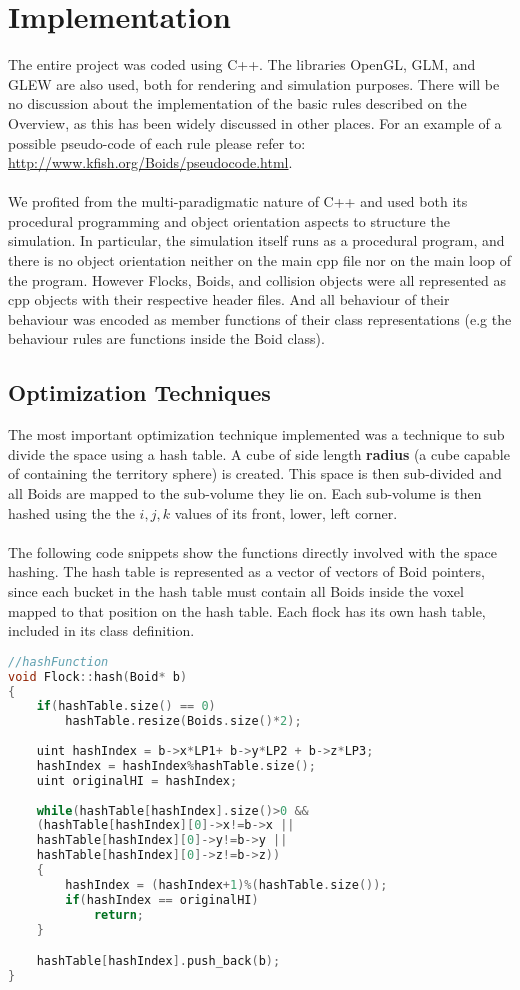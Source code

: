 \documentclass[12pt]{article}
\begin{document}
\section{Implementation}
The entire project was coded using C++. The libraries OpenGL, GLM, and GLEW are also used, both for rendering and simulation purposes. There will be no discussion about the implementation of the basic rules described on the Overview, as this has been widely discussed in other places. For an example of a possible pseudo-code of each rule please refer to: \url{http://www.kfish.org/Boids/pseudocode.html}.
\\ \\
We profited from the multi-paradigmatic nature of C++ and used both its procedural programming and object orientation aspects to structure the simulation. In particular, the simulation itself runs as a procedural program, and there is no object orientation neither on the main cpp file nor on the main loop of the program. However Flocks, Boids, and collision objects were all represented as cpp objects with their respective header files. And all behaviour of their behaviour was encoded as member functions of their class representations (e.g the behaviour rules are functions inside the Boid class). 

\subsection{Optimization Techniques}
The most important optimization technique implemented was a technique to sub divide the space using a hash table. A cube of side length \textbf{radius} (a cube capable of containing the territory sphere) is created. This space is then sub-divided and all Boids are mapped to the sub-volume they lie on. Each sub-volume is then hashed using the the $i,j,k$ values of its front, lower, left corner.
\\ \\
\noindent The following code snippets show the functions directly involved with the space hashing. The hash table is represented as a vector of vectors of Boid pointers, since each bucket in the hash table must contain all Boids inside the voxel mapped to that position on the hash table. Each flock has its own hash table, included in its class definition.

\begin{minipage}[t]{\textwidth}
\begin{lstlisting}[language=C++]
//hashFunction
void Flock::hash(Boid* b)
{
	if(hashTable.size() == 0)
		hashTable.resize(Boids.size()*2);
	
	uint hashIndex = b->x*LP1+ b->y*LP2 + b->z*LP3;
	hashIndex = hashIndex%hashTable.size();
	uint originalHI = hashIndex;
	
	while(hashTable[hashIndex].size()>0 &&
	(hashTable[hashIndex][0]->x!=b->x ||
	hashTable[hashIndex][0]->y!=b->y ||
	hashTable[hashIndex][0]->z!=b->z))
	{
		hashIndex = (hashIndex+1)%(hashTable.size());
		if(hashIndex == originalHI)
			return;
	}

	hashTable[hashIndex].push_back(b);
}
\end{lstlisting}
\end{minipage}
\end{document}

